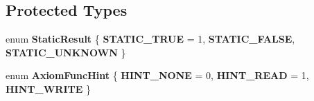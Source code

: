\subsection*{Protected Types}
\begin{DoxyCompactItemize}
\item 
\mbox{\label{classilang_1_1_memory_model_afe546333df3a1b28ce877c5db2b73ef6}} 
enum {\bfseries Static\+Result} \{ {\bfseries S\+T\+A\+T\+I\+C\+\_\+\+T\+R\+UE} = 1, 
{\bfseries S\+T\+A\+T\+I\+C\+\_\+\+F\+A\+L\+SE}, 
{\bfseries S\+T\+A\+T\+I\+C\+\_\+\+U\+N\+K\+N\+O\+WN}
 \}
\item 
\mbox{\label{classilang_1_1_memory_model_a96e9a07ed529173a6b3d5969bf352eb2}} 
enum {\bfseries Axiom\+Func\+Hint} \{ {\bfseries H\+I\+N\+T\+\_\+\+N\+O\+NE} = 0, 
{\bfseries H\+I\+N\+T\+\_\+\+R\+E\+AD} = 1, 
{\bfseries H\+I\+N\+T\+\_\+\+W\+R\+I\+TE}
 \}
\end{DoxyCompactItemize}
